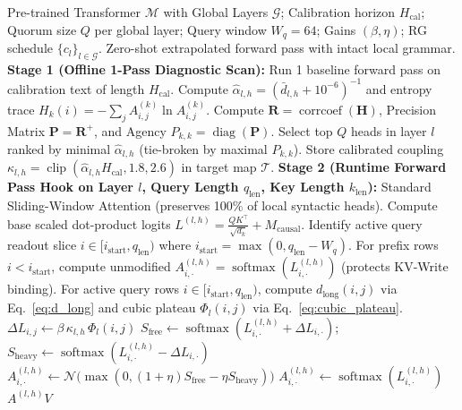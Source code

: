 \documentclass[11pt,letterpaper]{article}
\theoremstyle{definition}
\begin{document}
\begin{algorithm}[htbp]
\caption{Richardson Attention: Runtime Inference \& Depth-Progressive RG Relay}
\label{alg:richardson}
\begin{algorithmic}[1]
\Require Pre-trained Transformer $\mathcal{M}$ with Global Layers $\mathcal{G}$; Calibration horizon $H_{\text{cal}}$; Quorum size $Q$ per global layer; Query window $W_q = 64$; Gains $(\beta, \eta)$; RG schedule $\{c_l\}_{l \in \mathcal{G}}$.
\Ensure Zero-shot extrapolated forward pass with intact local grammar.
\State \textbf{Stage 1 (Offline 1-Pass Diagnostic Scan):}
\State Run 1 baseline forward pass on calibration text of length $H_{\text{cal}}$.
    \State Compute $\hat{\alpha}_{l,h} = (\bar{d}_{l,h} + 10^{-6})^{-1}$ and entropy trace $H_k(i) = -\sum_j A^{(k)}_{i,j} \ln A^{(k)}_{i,j}$.
\EndFor
\State Compute $\mathbf{R} = \operatorname{corrcoef}(\mathbf{H})$, Precision Matrix $\mathbf{P} = \mathbf{R}^+$, and Agency $P_{k,k} = \operatorname{diag}(\mathbf{P})$.
    \State Select top $Q$ heads in layer $l$ ranked by minimal $\hat{\alpha}_{l,h}$ (tie-broken by maximal $P_{k,k}$).
    \State Store calibrated coupling $\kappa_{l,h} = \operatorname{clip}(\hat{\alpha}_{l,h} H_{\text{cal}}, 1.8, 2.6)$ in target map $\mathcal{T}$.
\EndFor
\State \textbf{Stage 2 (Runtime Forward Pass Hook on Layer $l$, Query Length $q_{\text{len}}$, Key Length $k_{\text{len}}$):}
    \State \Return Standard Sliding-Window Attention (preserves 100\% of local syntactic heads).
\EndIf
\State Compute base scaled dot-product logits $L^{(l,h)} = \frac{Q K^\top}{\sqrt{d_k}} + M_{\text{causal}}$.
\State Identify active query readout slice $i \in [i_{\text{start}}, q_{\text{len}})$ where $i_{\text{start}} = \max(0, q_{\text{len}} - W_q)$.
\State For prefix rows $i < i_{\text{start}}$, compute unmodified $A^{(l,h)}_{i,\cdot} = \operatorname{softmax}(L^{(l,h)}_{i,\cdot})$ (protects KV-Write binding).
\State For active query rows $i \in [i_{\text{start}}, q_{\text{len}})$, compute $d_{\text{long}}(i,j)$ via Eq.~\eqref{eq:d_long} and cubic plateau $\Phi_l(i,j)$ via Eq.~\eqref{eq:cubic_plateau}.
        \State $\Delta L_{i,j} \gets \beta\, \kappa_{l,h}\, \Phi_l(i,j)$
        \State $S_{\text{free}} \gets \operatorname{softmax}(L^{(l,h)}_{i,\cdot} + \Delta L_{i,\cdot})$; \quad $S_{\text{heavy}} \gets \operatorname{softmax}(L^{(l,h)}_{i,\cdot} - \Delta L_{i,\cdot})$
        \State $A^{(l,h)}_{i,\cdot} \gets \mathcal{N}\!\big(\max(0, (1+\eta) S_{\text{free}} - \eta S_{\text{heavy}})\big)$
    \Else
        \State $A^{(l,h)}_{i,\cdot} \gets \operatorname{softmax}(L^{(l,h)}_{i,\cdot})$
    \EndIf
\EndFor
\State \Return $A^{(l,h)} V$
\end{algorithmic}
\end{algorithm}
\end{document}
